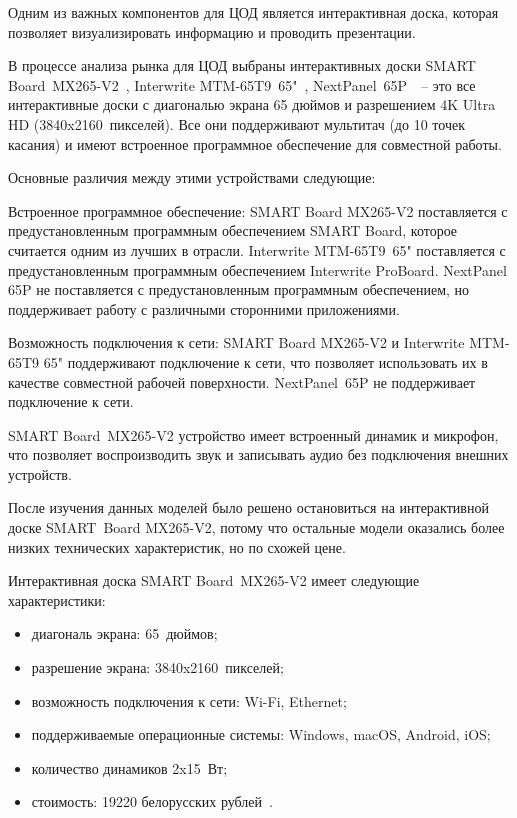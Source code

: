 Одним из важных компонентов для ЦОД является интерактивная доска, которая позволяет визуализировать информацию и проводить презентации.

В процессе анализа рынка для ЦОД выбраны интерактивных доски SMART Board~MX265-V2~\cite{smart_board}, Interwrite MTM-65T9~65"~\cite{interwrite-mtm-65t9}, NextPanel~65P~\cite{interaktivnye_paneli_46152}~-- это все интерактивные доски с диагональю экрана 65 дюймов и разрешением 4K Ultra HD (3840x2160~пикселей). Все они поддерживают мультитач (до 10 точек касания) и имеют встроенное программное обеспечение для совместной работы. 

Основные различия между этими устройствами следующие:
\begin{enumerate_num}
    \item Встроенное программное обеспечение: SMART Board MX265-V2 поставляется с предустановленным программным обеспечением SMART Board, которое считается одним из лучших в отрасли. Interwrite MTM-65T9~65" поставляется с предустановленным программным обеспечением Interwrite ProBoard. NextPanel 65P не поставляется с предустановленным программным обеспечением, но поддерживает работу с различными сторонними приложениями.
    \item Возможность подключения к сети: SMART Board MX265-V2 и Interwrite MTM-65T9 65" поддерживают подключение к сети, что позволяет использовать их в качестве совместной рабочей поверхности. NextPanel~65P не поддерживает подключение к сети.
    \item SMART Board~MX265-V2 устройство имеет встроенный динамик и микрофон, что позволяет воспроизводить звук и записывать аудио без подключения внешних устройств.
\end{enumerate_num}


После изучения данных моделей было решено остановиться на интерактивной доске SMART~Board MX265-V2, потому что остальные модели оказались более низких технических характеристик, но по схожей цене.

Интерактивная доска SMART Board~MX265-V2 имеет следующие характеристики:
\begin{itemize}
    \item диагональ экрана: 65~дюймов;
    \item разрешение экрана: 3840x2160~пикселей;
    \item возможность подключения к сети: Wi-Fi, Ethernet;
    \item поддерживаемые операционные системы: Windows, macOS, Android, iOS;
    \item количество динамиков 2x15~Вт;
    \item стоимость: 19220 белорусских рублей~\cite{smart_board}.
\end{itemize}

